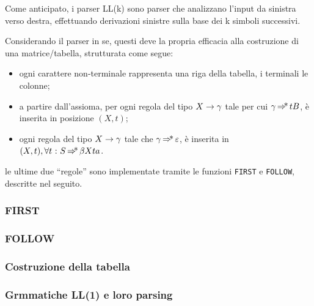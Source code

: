 \documentclass{subfiles}
\begin{document}
Come anticipato, i parser LL(k) sono parser che analizzano l'input da sinistra verso destra,
effettuando derivazioni sinistre sulla base dei k simboli successivi.

Considerando il parser in se, questi deve la propria efficacia alla costruzione di una matrice/tabella, strutturata come segue:
\begin{itemize}
    \item ogni carattere non-terminale rappresenta una riga della tabella, i terminali le colonne;
    \item a partire dall'assioma, per ogni regola del tipo \(\Grammar{X}{\gamma}\) tale per cui \(\gamma \operatorname{\Rightarrow\hspace{-5pt}*} tB\),
          è inserita in posizione \((X, t)\);

    \item ogni regola del tipo \(\Grammar{X}{\gamma}\) tale che \(\gamma \operatorname{\Rightarrow\hspace{-5pt}*} \varepsilon\),
          è inserita in \((X, t), \forall t \operatorname{\, : \,} S \operatorname{\Rightarrow\hspace{-5pt}*} \beta X t a\).
\end{itemize}

\begin{Note*}
    le ultime due ``regole'' sono implementate tramite le funzioni \lstinline{FIRST} e \lstinline{FOLLOW}, descritte nel seguito.
\end{Note*}

\subsubsection{FIRST}


\subsubsection{FOLLOW}

\clearpage
\subsubsection{Costruzione della tabella}


\subsubsection{Grmmatiche LL(1) e loro parsing}

\end{document}
